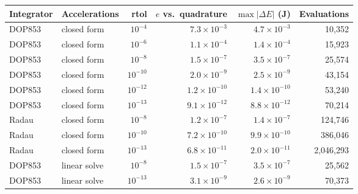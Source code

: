 \begin{tabular}{@{}llrrrr@{}}
\toprule
Integrator & Accelerations & rtol & $e$ vs.\ quadrature & $\max|\Delta E|$ (J) & Evaluations \\
\midrule
DOP853 & closed form & $10^{-4}$ & $7.3\times10^{-3}$ & $4.7\times10^{-3}$ & 10,352 \\
DOP853 & closed form & $10^{-6}$ & $1.1\times10^{-4}$ & $1.4\times10^{-4}$ & 15,923 \\
DOP853 & closed form & $10^{-8}$ & $1.5\times10^{-7}$ & $3.5\times10^{-7}$ & 25,574 \\
DOP853 & closed form & $10^{-10}$ & $2.0\times10^{-9}$ & $2.5\times10^{-9}$ & 43,154 \\
DOP853 & closed form & $10^{-12}$ & $1.2\times10^{-10}$ & $1.4\times10^{-10}$ & 53,240 \\
DOP853 & closed form & $10^{-13}$ & $9.1\times10^{-12}$ & $8.8\times10^{-12}$ & 70,214 \\
Radau & closed form & $10^{-8}$ & $1.2\times10^{-7}$ & $1.4\times10^{-7}$ & 124,746 \\
Radau & closed form & $10^{-10}$ & $7.2\times10^{-10}$ & $9.9\times10^{-10}$ & 386,046 \\
Radau & closed form & $10^{-13}$ & $6.8\times10^{-11}$ & $2.0\times10^{-11}$ & 2,046,293 \\
DOP853 & linear solve & $10^{-8}$ & $1.5\times10^{-7}$ & $3.5\times10^{-7}$ & 25,562 \\
DOP853 & linear solve & $10^{-13}$ & $3.1\times10^{-9}$ & $2.6\times10^{-9}$ & 70,373 \\
\bottomrule
\end{tabular}
